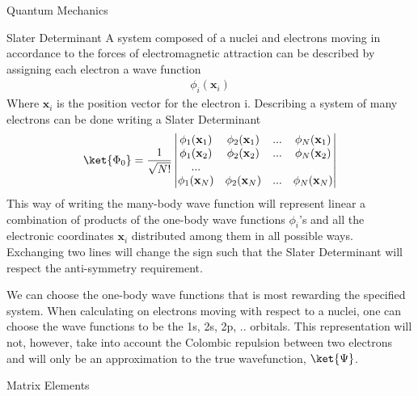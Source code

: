 \documentclass[twoside,english]{uiofysmaster}
\begin{document}
\begin{chapter}{Quantum Mechanics}
	\begin{section}{Slater Determinant}
		A system composed of a nuclei and electrons moving in accordance to the forces of electromagnetic attraction can be described by assigning each electron
		a wave function 
		\begin{align}
			\phi_i(\mathbf{x}_i)
		\end{align}
		Where $\mathbf{x}_i$ is the position vector for the electron i. Describing a system of many electrons can be done writing a Slater Determinant
		\begin{align}
			\ket{\Phi_0} = \frac{1}{ \sqrt{N!} } \left|\begin{matrix}
				\phi_1(\mathbf{x}_1) & \phi_2(\mathbf{x}_1) & ... & \phi_N(\mathbf{x}_1) \\
				\phi_1(\mathbf{x}_2) & \phi_2(\mathbf{x}_2) & ... & \phi_N(\mathbf{x}_2) \\
				... & & & \\
				\phi_1(\mathbf{x}_N) & \phi_2(\mathbf{x}_N) & ... & \phi_N(\mathbf{x}_N) 
			\end{matrix} \right|
		\end{align}
		This way of writing the many-body wave function will represent linear a combination of products of the one-body wave functions $\phi_i$'s and all the electronic coordinates
		$\mathbf{x}_i$ distributed among them in all possible ways. Exchanging two lines will change the sign such that the Slater Determinant will respect the anti-symmetry 
		requirement. \par
		We can choose the one-body wave functions that is most rewarding the specified system. When calculating on electrons moving with respect to a nuclei, one can choose the wave
		functions to be the 1s, 2s, 2p, .. orbitals. This representation will not, however, take into account the Colombic repulsion between two electrons and will only be an 
		approximation to the true wavefunction, $\ket{\Psi}$.
	\end{section}

	\begin{section}{Matrix Elements}
		
	\end{section}

\end{chapter}
\end{document}
